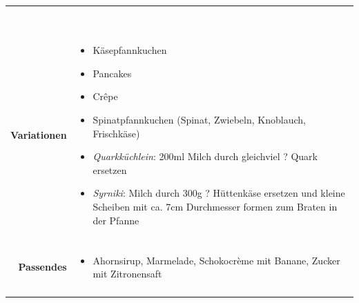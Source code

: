 \documentclass[a4paper, 12pt]{scrbook} 								%
\numberwithin{equation}{section} 									%
\begin{document}
\begin{tabularx}{\textwidth}{r|L}
\begin{tabular}[t]{llll}
										\end{tabular}	\\
									&	\\
			\textbf{Variationen}	&	\begin{itemize}[]
											\item Käsepfannkuchen
											\item Pancakes
											\item Crêpe
											\item Spinatpfannkuchen (Spinat, Zwiebeln, Knoblauch, Frischkäse)
											\item \emph{Quarkküchlein}: 200ml Milch durch gleichviel ? Quark ersetzen
											\item \emph{Syrniki}: Milch durch 300g ? Hüttenkäse ersetzen und kleine Scheiben mit ca. 7cm Durchmesser formen zum Braten in der Pfanne
										\end{itemize}	\\
									&	\\	
			\textbf{Passendes}		&	\begin{itemize}[]
											\item Ahornsirup, Marmelade, Schokocrème mit Banane, Zucker mit Zitronensaft
										\end{itemize}	\\
									&	\\	
		\end{tabularx}
\end{document}
